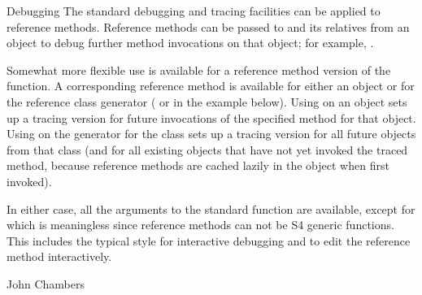 %
\begin{Section}{Debugging}
The standard \R{} debugging and tracing facilities can be applied to
reference methods.
Reference methods can be passed to  and its
relatives from an object to debug further method invocations on that
object; for example, . 

Somewhat more flexible use is available for a reference method version
of the  function.
A corresponding  
reference method is available for
either an object or for the reference class generator
( or  in the example below).
Using  on an object sets up a tracing
version for future invocations of the specified method for that
object.
Using  on the generator for the class sets up a
tracing version for all future objects from that class (and for all
existing objects that have not yet invoked the traced method, because
reference methods are cached lazily in the object when first invoked).

In either case, all the arguments to the standard  
function are available, except for  which is
meaningless since reference methods can not be S4 generic functions.
This includes the typical style  for
interactive debugging and   to edit the
reference method interactively.

\end{Section}
%
\begin{Author}\relax
John Chambers
\end{Author}
%
